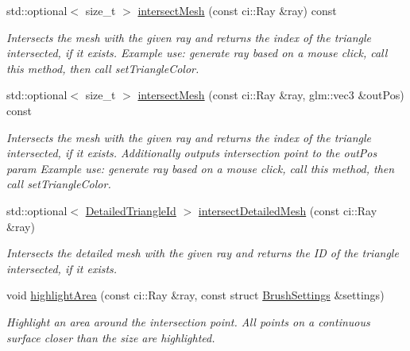 \begin{DoxyCompactItemize}
std\+::optional$<$ size\+\_\+t $>$ \mbox{\hyperlink{classpepr3d_1_1_geometry_ace58dc7a4182240000e9b773cb8da4ee}{intersect\+Mesh}} (const ci\+::\+Ray \&ray) const
\begin{DoxyCompactList}\small\item\em Intersects the mesh with the given ray and returns the index of the triangle intersected, if it exists. Example use\+: generate ray based on a mouse click, call this method, then call set\+Triangle\+Color. \end{DoxyCompactList}\item 
\mbox{\label{classpepr3d_1_1_geometry_a039de87ce062281b93132481ca7ddba8}} 
std\+::optional$<$ size\+\_\+t $>$ \mbox{\hyperlink{classpepr3d_1_1_geometry_a039de87ce062281b93132481ca7ddba8}{intersect\+Mesh}} (const ci\+::\+Ray \&ray, glm\+::vec3 \&out\+Pos) const
\begin{DoxyCompactList}\small\item\em Intersects the mesh with the given ray and returns the index of the triangle intersected, if it exists. Additionally outputs intersection point to the out\+Pos param Example use\+: generate ray based on a mouse click, call this method, then call set\+Triangle\+Color. \end{DoxyCompactList}\item 
std\+::optional$<$ \mbox{\hyperlink{structpepr3d_1_1_detailed_triangle_id}{Detailed\+Triangle\+Id}} $>$ \mbox{\hyperlink{classpepr3d_1_1_geometry_ae68a633ab4ab435156e0b03e64c9ede9}{intersect\+Detailed\+Mesh}} (const ci\+::\+Ray \&ray)
\begin{DoxyCompactList}\small\item\em Intersects the detailed mesh with the given ray and returns the ID of the triangle intersected, if it exists. \end{DoxyCompactList}\item 
\mbox{\label{classpepr3d_1_1_geometry_a69f784973726ce83893d8ec3fcdf9ff1}} 
void \mbox{\hyperlink{classpepr3d_1_1_geometry_a69f784973726ce83893d8ec3fcdf9ff1}{highlight\+Area}} (const ci\+::\+Ray \&ray, const struct \mbox{\hyperlink{structpepr3d_1_1_brush_settings}{Brush\+Settings}} \&settings)
\begin{DoxyCompactList}\small\item\em Highlight an area around the intersection point. All points on a continuous surface closer than the size are highlighted. \end{DoxyCompactList}\item 

\end{DoxyCompactItemize}
